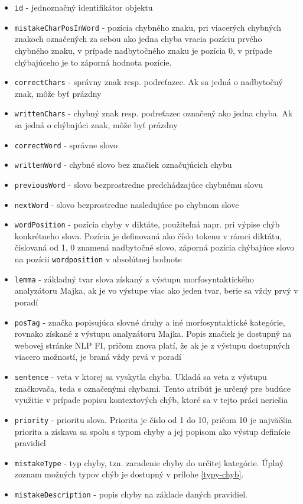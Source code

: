 \documentclass[12pt,oneside]{fithesis2}
\begin{document}
      \begin{itemize}
	\item \texttt{id} - jednoznačný identifikátor objektu
	\item \texttt{mistakeCharPosInWord} - pozícia chybného znaku, pri viacerých chybných znakoch označených za sebou ako jedna chyba vracia pozíciu prvého chybného znaku, v prípade nadbytočného znaku je pozícia 0, v prípade chýbajúceho je to záporná hodnota pozície.
	\item \texttt{correctChars} - správny znak resp. podreťazec. Ak sa jedná o nadbytočný znak, môže byť prázdny
	\item \texttt{writtenChars} - chybný znak resp. podreťazec označený ako jedna chyba. Ak sa jedná o chýbajúci znak, môže byť prázdny
	\item \texttt{correctWord} - správne slovo
	\item \texttt{writtenWord} - chybné slovo bez značiek označujúcich chybu
	\item \texttt{previousWord} - slovo bezprostredne predchádzajúce chybnému slovu
	\item \texttt{nextWord} - slovo bezprostredne nasledujúce po chybnom slove
	\item \texttt{wordPosition} - pozícia chyby v diktáte, použiteľná napr. pri výpise chýb konkrétneho slova. Pozícia je definovaná ako číslo tokenu v rámci diktátu, číslovaná od 1, 0 znamená nadbytočné slovo, záporná pozícia chýbajúce slovo na pozícii \texttt{wordposition} v absolútnej hodnote
	\item \texttt{lemma} - základný tvar slova získaný z výstupu morfosyntaktického analyzátoru Majka\cite{majka}, ak je vo výstupe viac ako jeden tvar, berie sa vždy prvý v poradí
	\item \texttt{posTag} - značka popisujúca slovné druhy a iné morfosyntaktické kategórie, rovnako získané z výstupu analyzátoru Majka. Popis značiek je dostupný na webovej stránke NLP FI\cite{nlpfi}, pričom znova platí, že ak je z výstupu dostupných viacero možností, je braná vždy prvá v poradí
	\item \texttt{sentence} - veta v ktorej sa vyskytla chyba. Ukladá sa veta z výstupu značkovača, teda s označenými chybami. Tento atribút je určený pre budúce využitie v prípade popisu kontextových chýb, ktoré sa v tejto práci neriešia
	\item \texttt{priority} - prioritu slova. Priorita je číslo od 1 do 10, pričom 10 je najväčšia priorita a získava sa spolu s typom chyby a jej popisom ako výstup definície pravidiel
	\item \texttt{mistakeType} - typ chyby, tzn. zaradenie chyby do určitej kategórie. Úplný zoznam možných typov chýb je dostupný v prílohe \ref{typy-chyb}.
	\item \texttt{mistakeDescription} - popis chyby na základe daných pravidiel.
\end{itemize}
\end{document}
